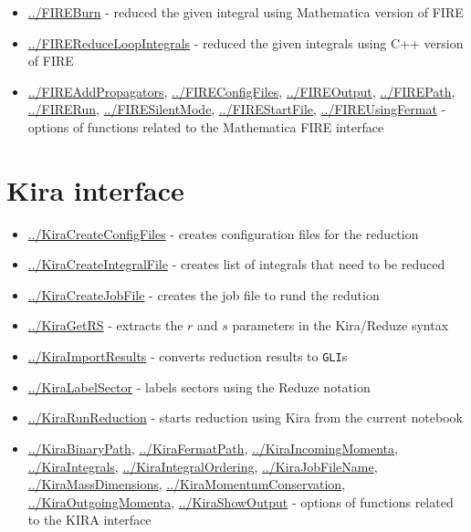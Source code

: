\documentclass[../FeynHelpersManual.tex]{subfiles}
\begin{document}
\begin{itemize}
\tightlist
\item
  \hyperlink{../fireburn}{../FIREBurn} - reduced the given integral
  using Mathematica version of FIRE
\item
  \hyperlink{../firereduceloopintegrals}{../FIREReduceLoopIntegrals} -
  reduced the given integrals using C++ version of FIRE
\item
  \hyperlink{../fireaddpropagators}{../FIREAddPropagators},
  \hyperlink{../fireconfigfiles}{../FIREConfigFiles},
  \hyperlink{../fireoutput}{../FIREOutput},
  \hyperlink{../firepath}{../FIREPath},
  \hyperlink{../firerun}{../FIRERun},
  \hyperlink{../firesilentmode}{../FIRESilentMode},
  \hyperlink{../firestartfile}{../FIREStartFile},
  \hyperlink{../fireusingfermat}{../FIREUsingFermat} - options of
  functions related to the Mathematica FIRE interface
\end{itemize}

\hypertarget{kira interface}{
\section{Kira interface}\label{kira interface}}

\begin{itemize}
\tightlist
\item
  \hyperlink{../kiracreateconfigfiles}{../KiraCreateConfigFiles} -
  creates configuration files for the reduction
\item
  \hyperlink{../kiracreateintegralfile}{../KiraCreateIntegralFile} -
  creates list of integrals that need to be reduced
\item
  \hyperlink{../kiracreatejobfile}{../KiraCreateJobFile} - creates the
  job file to rund the redution
\item
  \hyperlink{../kiragetrs}{../KiraGetRS} - extracts the \(r\) and \(s\)
  parameters in the Kira/Reduze syntax
\item
  \hyperlink{../kiraimportresults}{../KiraImportResults} - converts
  reduction results to \texttt{GLI}s
\item
  \hyperlink{../kiralabelsector}{../KiraLabelSector} - labels sectors
  using the Reduze notation
\item
  \hyperlink{../kirarunreduction}{../KiraRunReduction} - starts
  reduction using Kira from the current notebook
\item
  \hyperlink{../kirabinarypath}{../KiraBinaryPath},
  \hyperlink{../kirafermatpath}{../KiraFermatPath},
  \hyperlink{../kiraincomingmomenta}{../KiraIncomingMomenta},
  \hyperlink{../kiraintegrals}{../KiraIntegrals},
  \hyperlink{../kiraintegralordering}{../KiraIntegralOrdering},
  \hyperlink{../kirajobfilename}{../KiraJobFileName},
  \hyperlink{../kiramassdimensions}{../KiraMassDimensions},
  \hyperlink{../kiramomentumconservation}{../KiraMomentumConservation},
  \hyperlink{../kiraoutgoingmomenta}{../KiraOutgoingMomenta},
  \hyperlink{../kirashowoutput}{../KiraShowOutput} - options of
  functions related to the KIRA interface
\end{itemize}
\end{document}
